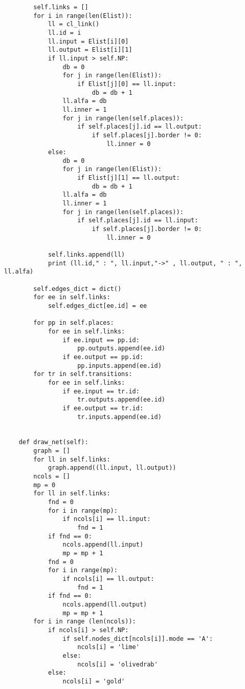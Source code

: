 \documentclass[12pt,a4paper]{book}
\begin{document}
\begin{verbatim}
        self.links = []
        for i in range(len(Elist)):
            ll = cl_link()
            ll.id = i
            ll.input = Elist[i][0]
            ll.output = Elist[i][1]
            if ll.input > self.NP:
                db = 0
                for j in range(len(Elist)):
                    if Elist[j][0] == ll.input:
                        db = db + 1
                ll.alfa = db
                ll.inner = 1
                for j in range(len(self.places)):
                    if self.places[j].id == ll.output:
                        if self.places[j].border != 0:
                            ll.inner = 0
            else:
                db = 0
                for j in range(len(Elist)):
                    if Elist[j][1] == ll.output:
                        db = db + 1
                ll.alfa = db
                ll.inner = 1
                for j in range(len(self.places)):
                    if self.places[j].id == ll.input:
                        if self.places[j].border != 0:
                            ll.inner = 0
            
            self.links.append(ll)
            print (ll.id," : ", ll.input,"->" , ll.output, " : ", ll.alfa)
        
        self.edges_dict = dict()
        for ee in self.links:
            self.edges_dict[ee.id] = ee
        
        for pp in self.places:
            for ee in self.links:
                if ee.input == pp.id:
                    pp.outputs.append(ee.id)
                if ee.output == pp.id:
                    pp.inputs.append(ee.id)
        for tr in self.transitions:
            for ee in self.links:
                if ee.input == tr.id:
                    tr.outputs.append(ee.id)
                if ee.output == tr.id:
                    tr.inputs.append(ee.id)
    
    
    def draw_net(self):
        graph = []
        for ll in self.links:
            graph.append((ll.input, ll.output))
        ncols = []
        mp = 0
        for ll in self.links:
            fnd = 0
            for i in range(mp):
                if ncols[i] == ll.input:
                    fnd = 1
            if fnd == 0:
                ncols.append(ll.input)
                mp = mp + 1
            fnd = 0
            for i in range(mp):
                if ncols[i] == ll.output:
                    fnd = 1
            if fnd == 0:
                ncols.append(ll.output)
                mp = mp + 1
        for i in range (len(ncols)):
            if ncols[i] > self.NP:
                if self.nodes_dict[ncols[i]].mode == 'A':
                    ncols[i] = 'lime'
                else:
                    ncols[i] = 'olivedrab'
            else:
                ncols[i] = 'gold'
            

\end{verbatim}
\end{document}
